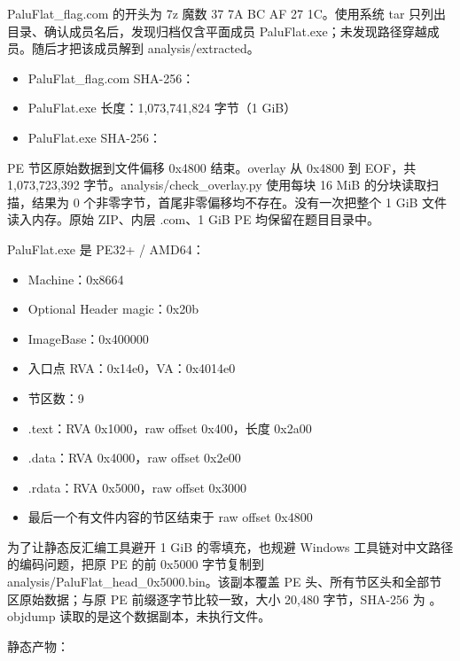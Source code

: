 PaluFlat\_flag.com 的开头为 7z 魔数 37 7A BC AF 27 1C。使用系统 tar 只列出目录、确认成员名后，发现归档仅含平面成员 PaluFlat.exe；未发现路径穿越成员。随后才把该成员解到 analysis/extracted。

\begin{itemize}
\tightlist
\item
  PaluFlat\_flag.com SHA-256：
\item
  PaluFlat.exe 长度：1,073,741,824 字节（1 GiB）
\item
  PaluFlat.exe SHA-256：
\end{itemize}

PE 节区原始数据到文件偏移 0x4800 结束。overlay 从 0x4800 到 EOF，共 1,073,723,392 字节。analysis/check\_overlay.py 使用每块 16 MiB 的分块读取扫描，结果为 0 个非零字节，首尾非零偏移均不存在。没有一次把整个 1 GiB 文件读入内存。原始 ZIP、内层 .com、1 GiB PE 均保留在题目目录中。

PaluFlat.exe 是 PE32+ / AMD64：

\begin{itemize}
\tightlist
\item
  Machine：0x8664
\item
  Optional Header magic：0x20b
\item
  ImageBase：0x400000
\item
  入口点 RVA：0x14e0，VA：0x4014e0
\item
  节区数：9
\item
  .text：RVA 0x1000，raw offset 0x400，长度 0x2a00
\item
  .data：RVA 0x4000，raw offset 0x2e00
\item
  .rdata：RVA 0x5000，raw offset 0x3000
\item
  最后一个有文件内容的节区结束于 raw offset 0x4800
\end{itemize}

为了让静态反汇编工具避开 1 GiB 的零填充，也规避 Windows 工具链对中文路径的编码问题，把原 PE 的前 0x5000 字节复制到 analysis/PaluFlat\_head\_0x5000.bin。该副本覆盖 PE 头、所有节区头和全部节区原始数据；与原 PE 前缀逐字节比较一致，大小 20,480 字节，SHA-256 为 。objdump 读取的是这个数据副本，未执行文件。

静态产物：

